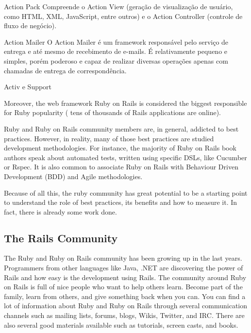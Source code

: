 Action Pack
Compreende o Action View (geração de visualização de usuário, como HTML, XML, JavaScript, entre outros) e o Action Controller (controle de fluxo de negócio).

Action Mailer
O Action Mailer é um framework responsável pelo serviço de entrega e até mesmo de recebimento de e-mails. É relativamente pequeno e simples, porém poderoso e capaz de realizar diversas operações apenas com chamadas de entrega de correspondência.

Activ
e Support



Moreover, the web framework Ruby on Rails is considered the biggest responsible for Ruby popularity
( tens of thousands of Rails applications are online).

Ruby and Ruby on Rails community members are, in general, addicted to best practices.
However, in reality, many of those best practices are studied development methodologies.
For instance, the majority of Ruby on Rails book authors speak about automated tests, written using specific DSLs, like Cucumber or Rspec.
It is also common to associate Ruby on Rails with Behaviour Driven Development (BDD) and Agile methodologies.

Because of all this, the ruby community has great potential to be a starting point to understand the role of best practices, its benefits and how to measure it.
In fact, there is already some work done.


\subsection{The Rails Community} 
The Ruby and Ruby on Rails community has been growing up in the last years. Programmers from other languages like Java, .NET are discovering the power of Rails and how easy is the development using Rails.
The community around Ruby on Rails is full of nice people who want to help others learn. Become part of the family, learn from others, and give something back when you can.
You can find a lot of information about Ruby and Ruby on Rails through several communication channels such as mailing lists, forums, blogs, Wikis, Twitter, and IRC. There are also several good materials available such as tutorials, screen casts, and books.


